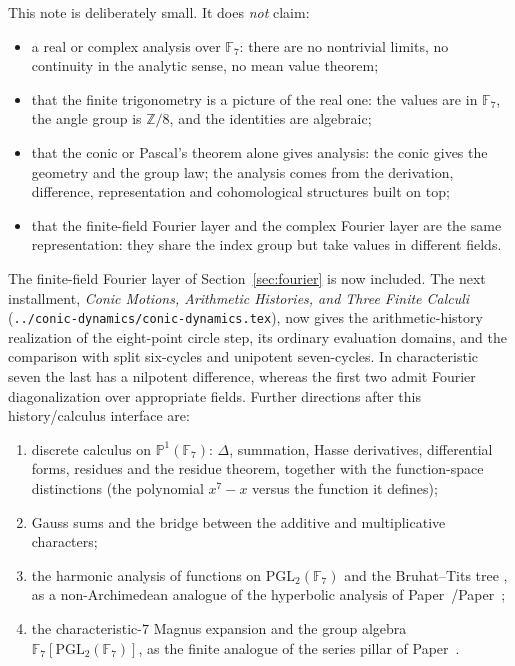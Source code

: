 \documentclass[11pt]{article}
\theoremstyle{definition}
\theoremstyle{remark}
\newcommand{\F}{\mathbb{F}}
\newcommand{\Z}{\mathbb{Z}}
\begin{document}
This note is deliberately small.  It does \emph{not} claim:
\begin{itemize}
  \item a real or complex analysis over $\F_7$: there are no nontrivial limits,
        no continuity in the analytic sense, no mean value theorem;
  \item that the finite trigonometry is a picture of the real one: the values
        are in $\F_7$, the angle group is $\Z/8$, and the identities are
        algebraic;
  \item that the conic or Pascal's theorem alone gives analysis: the conic gives
        the geometry and the group law; the analysis comes from the derivation,
        difference, representation and cohomological structures built on top;
  \item that the finite-field Fourier layer and the complex Fourier layer are
        the same representation: they share the index group but take values in
        different fields.
\end{itemize}

The finite-field Fourier layer of Section~\ref{sec:fourier} is now included.
The next installment, \emph{Conic Motions, Arithmetic Histories, and Three
Finite Calculi} (\texttt{../conic-dynamics/conic-dynamics.tex}), now gives the
arithmetic-history realization of the eight-point circle step, its ordinary
evaluation domains, and the comparison with split six-cycles and unipotent
seven-cycles.  In characteristic seven the last has a nilpotent difference,
whereas the first two admit Fourier diagonalization over appropriate fields.
Further directions after this history/calculus interface are:
\begin{enumerate}
  \item discrete calculus on $\mathbb P^1(\F_7)$: $\Delta$, summation, Hasse
        derivatives, differential forms, residues and the residue theorem,
        together with the function-space distinctions (the polynomial
        $x^7-x$ versus the function it defines);
  \item Gauss sums and the bridge between the additive and multiplicative
        characters;
  \item the harmonic analysis of functions on $\mathrm{PGL}_2(\F_7)$ and the
        Bruhat--Tits tree \cite{Serre}, as a non-Archimedean analogue of the
        hyperbolic analysis of Paper~\cite{Paper0}/Paper~\cite{Paper1};
  \item the characteristic-$7$ Magnus expansion and the group algebra
        $\F_7[\mathrm{PGL}_2(\F_7)]$, as the finite analogue of the series
        pillar of Paper~\cite{Paper1}.
\end{enumerate}
\end{document}
